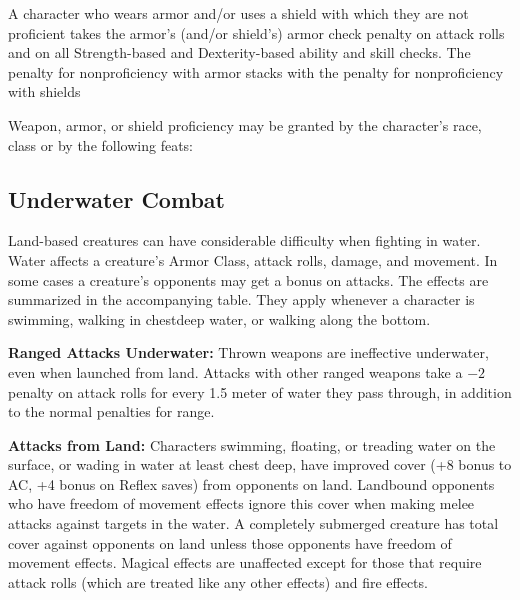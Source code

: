 A character who wears armor and/or uses a shield with which they are not proficient takes the armor's (and/or shield's) armor check penalty on attack rolls and on all Strength-based and Dexterity-based ability and skill checks. The penalty for nonproficiency with armor stacks with the penalty for nonproficiency with shields

Weapon, armor, or shield proficiency may be granted by the character's race, class or by the following feats:

\begin{itemize*}
\item {}
\item {}
\item {}
\item {}
\item {}
\item {}
\item {}
\item {}
\end{itemize*}

\subsection{Underwater Combat}
Land-based creatures can have considerable difficulty when fighting in water. Water affects a creature's Armor Class, attack rolls, damage, and movement. In some cases a creature's opponents may get a bonus on attacks. The effects are summarized in the accompanying table. They apply whenever a character is swimming, walking in chestdeep water, or walking along the bottom.

\textbf{Ranged Attacks Underwater:} Thrown weapons are ineffective underwater, even when launched from land. Attacks with other ranged weapons take a $-2$ penalty on attack rolls for every 1.5 meter of water they pass through, in addition to the normal penalties for range.

\textbf{Attacks from Land:} Characters swimming, floating, or treading water on the surface, or wading in water at least chest deep, have improved cover (+8 bonus to AC, +4 bonus on Reflex saves) from opponents on land. Landbound opponents who have freedom of movement effects ignore this cover when making melee attacks against targets in the water. A completely submerged creature has total cover against opponents on land unless those opponents have freedom of movement effects. Magical effects are unaffected except for those that require attack rolls (which are treated like any other effects) and fire effects.

